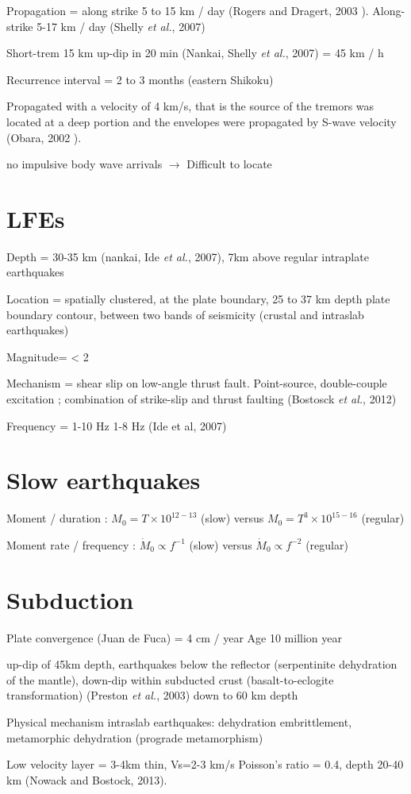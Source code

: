 \documentclass[main.tex]{subfiles}
\begin{document}
Propagation = along strike 5 to 15 km / day (Rogers and Dragert, 2003 \cite{ROG_2003}). Along-strike 5-17 km / day (Shelly \textit{et al.}, 2007)

Short-trem 15 km up-dip in 20 min (Nankai, Shelly \textit{et al.}, 2007) = 45 km / h

Recurrence interval = 2 to 3 months (eastern Shikoku)

Propagated with a velocity of 4 km/s, that is the source of the tremors was located at a deep portion and the envelopes were propagated by S-wave velocity (Obara, 2002 \cite{OBA_2002}).

no impulsive body wave arrivals $\rightarrow$ Difficult to locate

\chapter{LFEs}

Depth = 30-35 km (nankai, Ide \textit{et al.}, 2007), 7km above regular intraplate earthquakes

Location = spatially clustered, at the plate boundary, 25 to 37 km depth plate boundary contour, between two bands of seismicity (crustal and intraslab earthquakes)

Magnitude= < 2

Mechanism = shear slip on low-angle thrust fault. Point-source, double-couple excitation ; combination of strike-slip and thrust faulting (Bostosck \textit{et al.}, 2012)

Frequency = 1-10 Hz 1-8 Hz (Ide et al, 2007)

\chapter{Slow earthquakes}

Moment / duration : $M_0 = T \times 10^{12-13}$ (slow) versus $M_0 = T^3 \times 10^{15-16}$ (regular)

Moment rate / frequency : $\dot{M}_0 \propto f^{-1}$ (slow) versus $\dot{M}_0 \propto f^{-2}$ (regular)
 
\chapter{Subduction}

Plate convergence (Juan de Fuca) = 4 cm / year
Age 10 million year

up-dip of 45km depth, earthquakes below the reflector (serpentinite dehydration of the mantle), down-dip within subducted crust (basalt-to-eclogite transformation) (Preston \textit{et al.}, 2003) down to 60 km depth

Physical mechanism intraslab earthquakes: dehydration embrittlement, metamorphic dehydration (prograde metamorphism)

Low velocity layer = 3-4km thin, Vs=2-3 km/s Poisson's ratio = 0.4, depth 20-40 km (Nowack and Bostock, 2013).
\end{document}
